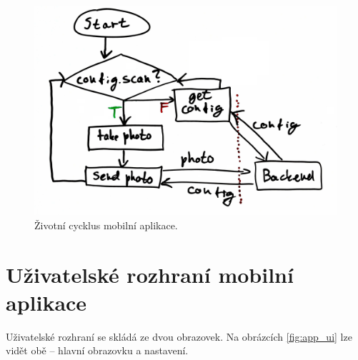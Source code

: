 \begin{figure}[!htb] \centering
  \includegraphics[width=135mm]{../img/app_lifecycle.jpg}
  \caption{Životní cycklus mobilní aplikace.}
  \label{fig:app_lifecycle}
\end{figure}

\section{Uživatelské rozhraní mobilní aplikace}

\noindent
Uživatelské rozhraní se skládá ze dvou obrazovek. Na obrázcích \ref{fig:app_ui}
lze vidět obě -- hlavní obrazovku a nastavení.

